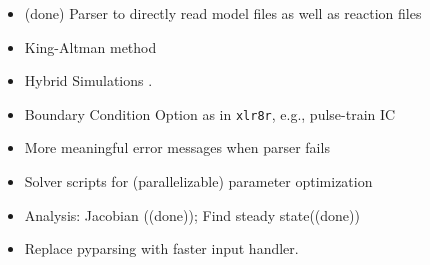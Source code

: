 \begin{itemize}
\item[\checkmark] (done) Parser to directly read model files as well as reaction files
\item King-Altman method\cite{King-Altman,Cornish-Bowden}
\item Hybrid Simulations \cite{GY-Diss,GY-MIT, GY-INPREP}.
\item Boundary Condition Option as in {\tt xlr8r}, e.g., pulse-train IC
\item More meaningful error messages when parser fails
\item Solver scripts for (parallelizable) parameter optimization
\item Analysis: Jacobian (\checkmark (done)); Find steady state(\checkmark (done))
\item Replace pyparsing with faster input handler.
\end{itemize}
